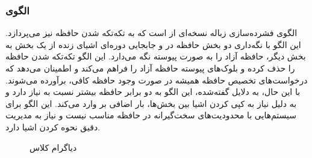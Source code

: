 \subsubsection{الگوی }
\label{memGarbCompatorSec}
\begin{RTL}
الگوی فشرده‌سازی زباله \cite{ref4}
نسخه‌ای از 
است که به تکه‌تکه شدن
حافظه نیز می‌پردازد. این الگو با نگه‌داری دو بخش حافظه
در  و جابجایی دوره‌ای اشیای زنده از یک بخش
به بخش دیگر، حافظه آزاد را به صورت پیوسته نگه می‌دارد.
این الگو تکه‌تکه شدن حافظه را حذف کرده و
بلوک‌های پیوسته حافظه آزاد را فراهم می‌کند و
اطمینان می‌دهد که درخواست‌های تخصیص حافظه همیشه در صورت
وجود حافظه کافی، برآورده می‌شوند. با این حال،
به دلایل گفته‌شده، این الگو به دو برابر حافظه بیشتر نسبت
به  نیاز دارد و به دلیل نیاز
به کپی کردن اشیا بین بخش‌ها، بار اضافی بر
 وارد می‌کند. این الگو برای سیستم‌هایی با
محدودیت‌های سخت‌گیرانه در حافظه مناسب نیست و نیاز
به مدیریت دقیق نحوه کردن اشیا دارد.
\end{RTL}
\begin{figure}[h!]
\centering
{}
\caption{دیاگرام کلاس }
\label{memGarbCompatorClassDiag}
\end{figure}